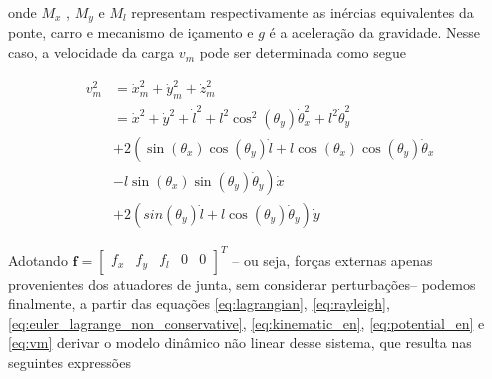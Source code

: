 \documentclass{ppgeesa}
\begin{document}
\noindent onde $M_x$ , $M_y$ e $M_l$ representam respectivamente as inércias equivalentes da ponte, carro e mecanismo de içamento
e $g$ é a aceleração da gravidade. Nesse caso, a velocidade da carga $v_m$ pode ser determinada como segue

\begin{align}
  v_m^2 &= \dot{x}_m^2 + \dot{y}_m^2 + \dot{z}_m^2 \nonumber \\ 
        & = \dot{x}^2 + \dot{y}^2 + \dot{l}^2 + l^2\cos^2(\theta_y)\dot{\theta}_x^2 + l^2\dot{\theta}_y^2 \nonumber\\
        &+2\left(\sin(\theta_x)\cos(\theta_y)\dot{l}+ l\cos(\theta_x)\cos(\theta_y)\dot{\theta}_x\right. \nonumber\\
        &- \left. l\sin(\theta_x)\sin(\theta_y)\dot{\theta}_y\right)\dot{x} \nonumber\\
        &+2\left(sin(\theta_y)\dot{l}+l\cos(\theta_y)\dot{\theta}_y\right)\dot{y}\label{eq:vm}
\end{align}

Adotando $\mathbf{f} = \left[\begin{array}{ccccc}f_x &f_y &f_l &0 &0\end{array}\right]^T$ -- ou seja, forças externas apenas provenientes dos atuadores de junta, sem considerar perturbações-- podemos finalmente, a partir das equações \ref{eq:lagrangian}, \ref{eq:rayleigh}, \ref{eq:euler_lagrange_non_conservative}, \ref{eq:kinematic_en}, \ref{eq:potential_en} e \ref{eq:vm} derivar o modelo dinâmico não linear desse sistema, que resulta nas seguintes expressões\cite{lee}
\end{document}
